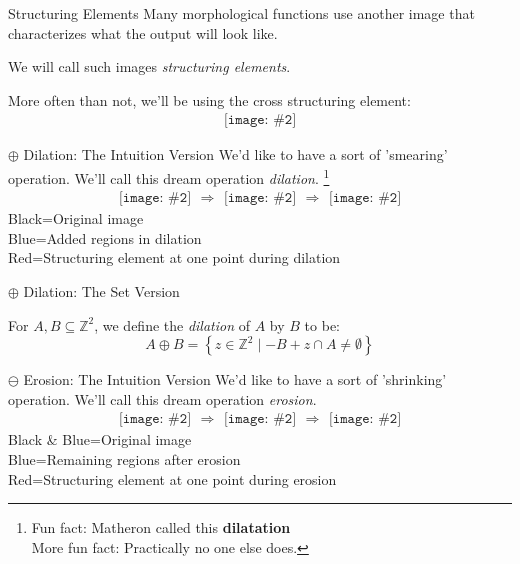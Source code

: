 \documentclass{beamer}
\newcommand{\pic}[2]{
     \begin{array}{l}
      \texttt{[image: \#2]}
      \end{array}
}
\newcommand{\set}[1]{\left\lbrace #1 \right\rbrace}
\newcommand{\buildset}[2]{\set{#1 \mid #2}}
\newcommand{\intersect}{\cap}
\newcommand{\integers}{\mathbb{Z}}
\newcommand{\dilate}{\oplus}
\newcommand{\erode}{\ominus}
\begin{document}
\begin{frame}{Structuring Elements}
  Many morphological functions use another image that characterizes 
  what the output will look like.

  We will call such images \emph{structuring elements}.

  More often than not, we'll be using the cross structuring element:
  $$\pic{width=50pt}{images/cross.png}$$
\end{frame}

\begin{frame}{$\dilate$ Dilation: The Intuition Version}
  We'd like to have a sort of 'smearing' operation. 
  We'll call this dream operation \emph{dilation}.
  \footnote{Fun fact: Matheron called this \textbf{dilatation}\\
            More fun fact: Practically no one else does.}
    $$\pic{width=75pt}{images/box}\Rightarrow
      \pic{width=75pt}{images/dilation_example.png}\Rightarrow
      \pic{width=75pt}{images/dilatedbox.png}$$
      Black=Original image\\
      Blue=Added regions in dilation\\
      Red=Structuring element at one point during dilation
\end{frame}

\begin{frame}{$\dilate$ Dilation: The Set Version}
  \begin{definition}
    For $A,B \subseteq \integers^2$, we define the \emph{dilation} of $A$ by $B$
    to be:
    $$A \dilate B = \buildset{z \in \mathbb{Z}^2}
                             {-B+z \intersect A \not= \emptyset}$$
  \end{definition}
  
\end{frame}
\begin{frame}{$\erode$ Erosion: The Intuition Version}
  We'd like to have a sort of 'shrinking' operation. 
  We'll call this dream operation \emph{erosion}.
    $$\pic{width=75pt}{images/box.png}\Rightarrow
      \pic{width=75pt}{images/erosion_example.png}\Rightarrow
      \pic{width=75pt}{images/erodedbox.png}$$
      Black \& Blue=Original image\\
       Blue=Remaining regions after erosion\\
       Red=Structuring element at one point during erosion
 
\end{frame}
\end{document}
